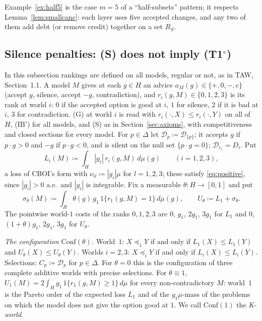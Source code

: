\documentclass[11pt]{article}
\theoremstyle{definition}\newtheorem{definition}[theorem]{Definition}
\theoremstyle{remark}\newtheorem{remark}[theorem]{Remark}
\newcommand{\Dscr}{\mathcal D}
\newcommand{\To}{\textup{(T1$^\circ$)}}
\begin{document}
Example~\ref{ex:half5} is the case $m=5$ of a ``half-subsets'' pattern; it
respects Lemma~\ref{lem:smallcanc}: each layer uses five accepted changes,
and any two of them add debt (or remove credit) together on a set $R_S$.

\subsection{Silence penalties: (S) does not imply \texorpdfstring{\To}{(T1o)}}\label{sec:conf}

In this subsection rankings are defined on all models, regular or not, as in
TAW, Section~1.1. A model $M$ gives at each $g\in H$ an advice
$a_M(g)\in\{+,0,-,\mathrm c\}$ (accept $g$, silence, accept $-g$,
contradiction), and $r_i(g,M)\in\{0,1,2,3\}$ is its rank at world $i$: $0$ if
the accepted option is good at $i$, $1$ for silence, $2$ if it is bad at $i$,
$3$ for contradiction. (G) at world $i$ is read with $r_i(\cdot,X)\le
r_i(\cdot,Y)$ on all of $H$, (IB$'$) for all models, and (S) as in
Section~\ref{sec:axioms}, with competitiveness and closed sections for every
model. For $p\in\Delta$ let $\Dscr_p\coloneqq\Dscr_{\{p\}}$; it accepts $g$
if $p\cdot g>0$ and $-g$ if $p\cdot g<0$, and is silent on the null set
$\{p\cdot g=0\}$; $\Dscr_{e_i}=D_i$. Put
\[
 L_i(M)\coloneqq\int_H|g_i|\,r_i(g,M)\,d\mu(g)\qquad(i=1,2,3),
\]
a loss of CBOI's form with $\nu_{il}\coloneqq|g_i|\mu$ for $l=1,2,3$; these
satisfy \eqref{eq:positive}, since $|g_i|>0$ a.e.\ and $|g_i|$ is
integrable. Fix a measurable $\theta\colon H\to[0,1]$ and put
\[
 \sigma_\theta(M)\coloneqq\int_H\theta(g)\,g_1\,1\{r_1(g,M)=1\}\,d\mu(g),
 \qquad U_\theta\coloneqq L_1+\sigma_\theta .
\]
The pointwise world-$1$ costs of the ranks $0,1,2,3$ are $0$, $g_1$, $2g_1$,
$3g_1$ for $L_1$ and $0$, $(1+\theta)g_1$, $2g_1$, $3g_1$ for $U_\theta$.

\emph{The configuration $\mathrm{Conf}(\theta)$.} World~$1$: $X\preceq_1Y$
if and only if $L_1(X)\le L_1(Y)$ and $U_\theta(X)\le U_\theta(Y)$. Worlds
$i=2,3$: $X\preceq_iY$ if and only if $L_i(X)\le L_i(Y)$. Selections:
$C_p\coloneqq\Dscr_p$ for $p\in\Delta$. For $\theta=0$ this is the
configuration of three complete additive worlds with precise selections. For
$\theta\equiv1$, $U_1(M)=2\int_Hg_1\,1\{r_1(g,M)\ge1\}\,d\mu$ for every
non-contradictory $M$: world~$1$ is the Pareto order of the expected loss
$L_1$ and of the $g_1\mu$-mass of the problems on which the model does not
give the option good at $1$. We call $\mathrm{Conf}(1)$ the \emph{K-world}.
\end{document}
